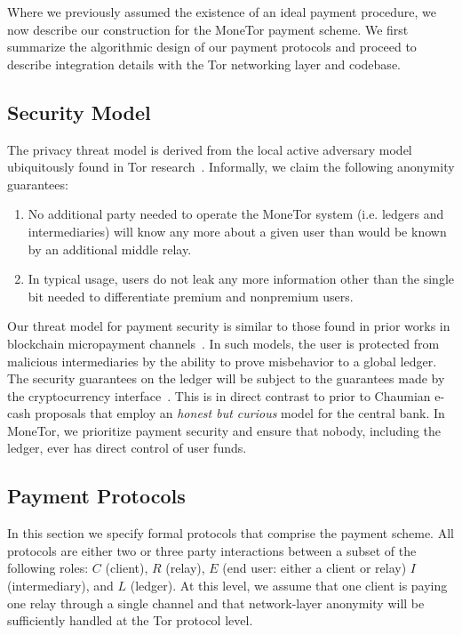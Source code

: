 Where we previously assumed the existence of an ideal payment procedure, we now
describe our construction for the MoneTor payment scheme. We first summarize the
algorithmic design of our payment protocols and proceed to describe integration
details with the Tor networking layer and codebase.

\subsection{Security Model}

The privacy threat model is derived from the local active adversary
model ubiquitously found in Tor research~\cite{dingledine2004tor}. Informally, we claim the following
anonymity guarantees:

\begin{enumerate}
\item No additional party needed to operate the MoneTor system (i.e. ledgers
  and intermediaries) will know any more about a given user than would be known
  by an additional middle relay.
\item In typical usage, users do not leak any more information other than the
  single bit needed to differentiate premium and nonpremium users.
\end{enumerate}

Our threat model for payment security is similar to those found in prior works
in blockchain micropayment channels~\cite{poon2016bitcoin}. In such models, the
user is protected from malicious intermediaries by the ability to prove
misbehavior to a global ledger. The security guarantees on the ledger will be
subject to the guarantees made by the cryptocurrency
interface~\cite{back2014enabling, poon2017plasma}. This is in direct contrast to
prior to Chaumian e-cash proposals that employ an \emph{honest but curious}
model for the central bank. In MoneTor, we prioritize payment security and
ensure that nobody, including the ledger, ever has direct control of user funds.

\subsection{Payment Protocols}

In this section we specify formal protocols that comprise the payment
scheme. All protocols are either two or three party interactions between a
subset of the following roles: $C$ (client), $R$ (relay), $E$ (end user: either
a client or relay) $I$ (intermediary), and $L$ (ledger). At this level, we
assume that one client is paying one relay through a single channel and that
network-layer anonymity will be sufficiently handled at the Tor protocol level.

